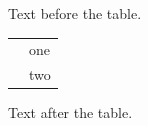 \documentclass[12pt]{article}
\begin{document}
Text before the table.

\begin{tabular}{|l|l|}\hline \cellcolor{green!20}\multirow{2}{*}{Span} & one\\ \cellcolor{green!20} & two\\\hline\end{tabular}

Text after the table.
\end{document}
